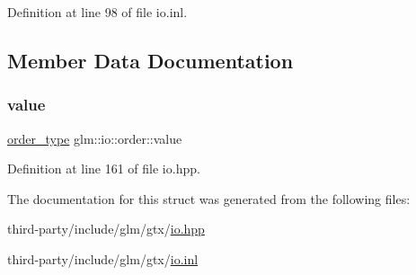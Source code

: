 Definition at line 98 of file io.\+inl.



\subsection{Member Data Documentation}
\mbox{\label{structglm_1_1io_1_1order_aa8788dd0568bacd081d02bd5aca9889b}} 
\subsubsection{\texorpdfstring{value}{value}}
{\footnotesize\ttfamily \hyperlink{namespaceglm_1_1io_a3497781803fe594a37177e05ab2a795f}{order\+\_\+type} glm\+::io\+::order\+::value}



Definition at line 161 of file io.\+hpp.



The documentation for this struct was generated from the following files\+:\begin{DoxyCompactItemize}
\item 
third-\/party/include/glm/gtx/\hyperlink{io_8hpp}{io.\+hpp}\item 
third-\/party/include/glm/gtx/\hyperlink{io_8inl}{io.\+inl}\end{DoxyCompactItemize}
